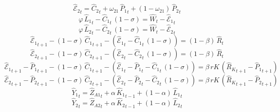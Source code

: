 \begin{dmath}
{{\hat{\mathscr{E}}_{2}}}_{t}={{\hat{C}_{2}}}_{t}+{{\omega_{21}}}\, {{\hat{P}_{1}}}_{t}+\left(1-{{\omega_{21}}}\right)\, {{\hat{P}_{2}}}_{t}
\end{dmath}
\begin{dmath}
{{\varphi}}\, {{\hat{L}_{1}}}_{t}-{{\hat{C}_{1}}}_{t}\, \left(1-{{\sigma}}\right)={{\hat{W}}}_{t}-{{\hat{\mathscr{E}}_{1}}}_{t}
\end{dmath}
\begin{dmath}
{{\varphi}}\, {{\hat{L}_{2}}}_{t}-{{\hat{C}_{2}}}_{t}\, \left(1-{{\sigma}}\right)={{\hat{W}}}_{t}-{{\hat{\mathscr{E}}_{2}}}_{t}
\end{dmath}
\begin{dmath}
{{\hat{\mathscr{E}}_{1}}}_{t+1}-\left(1-{{\sigma}}\right)\, {{\hat{C}_{1}}}_{t+1}-\left({{\hat{\mathscr{E}}_{1}}}_{t}-{{\hat{C}_{1}}}_{t}\, \left(1-{{\sigma}}\right)\right)=\left(1-{{\beta}}\right)\, {{\hat{R}}}_{t}
\end{dmath}
\begin{dmath}
{{\hat{\mathscr{E}}_{2}}}_{t+1}-\left(1-{{\sigma}}\right)\, {{\hat{C}_{2}}}_{t+1}-\left({{\hat{\mathscr{E}}_{2}}}_{t}-{{\hat{C}_{2}}}_{t}\, \left(1-{{\sigma}}\right)\right)=\left(1-{{\beta}}\right)\, {{\hat{R}}}_{t}
\end{dmath}
\begin{dmath}
{{\hat{\mathscr{E}}_{1}}}_{t+1}-{{\hat{P}_{1}}}_{t+1}-\left(1-{{\sigma}}\right)\, {{\hat{C}_{1}}}_{t+1}-\left({{\hat{\mathscr{E}}_{1}}}_{t}-{{\hat{P}_{1}}}_{t}-{{\hat{C}_{1}}}_{t}\, \left(1-{{\sigma}}\right)\right)={{\beta}}\, {rK}\, \left({{\hat{R}_{K}}}_{t+1}-{{\hat{P}_{1}}}_{t+1}\right)
\end{dmath}
\begin{dmath}
{{\hat{\mathscr{E}}_{2}}}_{t+1}-{{\hat{P}_{2}}}_{t+1}-\left(1-{{\sigma}}\right)\, {{\hat{C}_{2}}}_{t+1}-\left({{\hat{\mathscr{E}}_{2}}}_{t}-{{\hat{P}_{2}}}_{t}-{{\hat{C}_{2}}}_{t}\, \left(1-{{\sigma}}\right)\right)={{\beta}}\, {rK}\, \left({{\hat{R}_{K}}}_{t+1}-{{\hat{P}_{2}}}_{t+1}\right)
\end{dmath}
\begin{dmath}
{{\hat{Y}_{1}}}_{t}={{\hat{Z}_{A1}}}_{t}+{{\alpha}}\, {{\hat{K}_{1}}}_{t-1}+\left(1-{{\alpha}}\right)\, {{\hat{L}_{1}}}_{t}
\end{dmath}
\begin{dmath}
{{\hat{Y}_{2}}}_{t}={{\hat{Z}_{A2}}}_{t}+{{\alpha}}\, {{\hat{K}_{2}}}_{t-1}+\left(1-{{\alpha}}\right)\, {{\hat{L}_{2}}}_{t}
\end{dmath}
